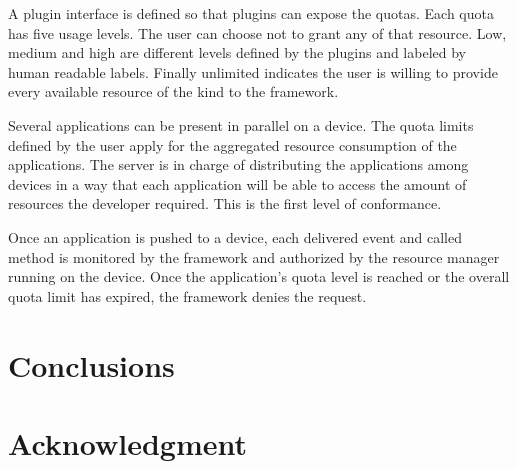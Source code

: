 \documentclass[conference,letterpaper]{IEEEtran}
\begin{document}
A plugin interface is defined so that plugins can expose the quotas. Each quota has five usage levels. The user can choose not to grant any of that resource. Low, medium and high are different levels defined by the plugins and labeled by human readable labels. Finally unlimited indicates the user is willing to provide every available resource of the kind to the framework.

Several applications can be present in parallel on a device. The quota limits defined by the user apply for the aggregated resource consumption of the applications. The server is in charge of distributing the applications among devices in a way that each application will be able to access the amount of resources the developer required. This is the first level of conformance.

Once an application is pushed to a device, each delivered event and called method is monitored by the framework and authorized by the resource manager running on the device. Once the application's quota level is reached or the overall quota limit has expired, the framework denies the request.


\section{Conclusions}
\label{sec:conclusion_and_future_work}

\section{Acknowledgment}
\label{sec:acknowledgment}


\end{document}

